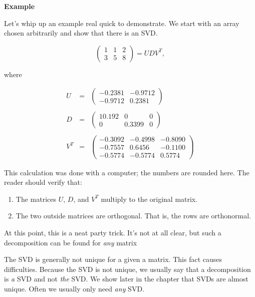 \documentclass{amsbook}
\begin{document}
\begin{tcolorbox}[title=Example,colback=blue!5]
{\bfseries\Large Example}

Let's whip up an example real quick to demonstrate.  We start with an array chosen arbitrarily and show that there is an SVD.

$$
\left(
\begin{array}{ccc}
1 & 1 & 2 \\ 3 & 5 & 8
\end{array}
\right) = UDV^T,
$$

where

$$
\begin{array}{rcl}
U &=& \left(
\begin{array}{cc}
-0.2381 & -0.9712 \\
-0.9712 & 0.2381
\end{array}
\right)\\
\\
D&=&\left(
\begin{array}{ccc}
10.192 & 0 & 0 \\
0 & 0.3399 & 0
\end{array}
\right)\\
\\
V^T&=&\left(
\begin{array}{ccc}
-0.3092 & -0.4998 & -0.8090 \\
-0.7557 & 0.6456 & -0.1100 \\
-0.5774 & -0.5774 & 0.5774
\end{array}
\right)
\end{array}
$$
 
This calculation was done with a computer; the numbers are rounded here.  The reader should verify that:

\begin{enumerate}
\item The matrices $U$, $D$, and $V^T$ multiply to the original matrix.
\item The two outside matrices are orthogonal.  That is, the rows are orthonormal.
\end{enumerate}

At this point, this is a neat party trick.  It's not at all clear, but such a decomposition can be found for {\em any} matrix
\end{tcolorbox}

The SVD is generally not unique for a given a matrix.  This fact causes difficulties.  Because the SVD is not unique, we usually say that a decomposition is {\em a} SVD and not {\em the} SVD.  We show later in the chapter that SVDs are almost unique.  Often we usually only need {\em any} SVD.
\end{document}
